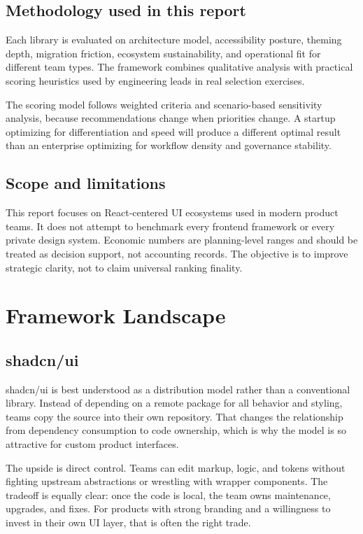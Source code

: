 \documentclass[11pt,twoside,a4paper]{article}
\begin{document}
\subsection{Methodology used in this report}
Each library is evaluated on architecture model, accessibility posture, theming depth, migration friction, ecosystem sustainability, and operational fit for different team types. The framework combines qualitative analysis with practical scoring heuristics used by engineering leads in real selection exercises.

The scoring model follows weighted criteria and scenario-based sensitivity analysis, because recommendations change when priorities change. A startup optimizing for differentiation and speed will produce a different optimal result than an enterprise optimizing for workflow density and governance stability.

\subsection{Scope and limitations}
This report focuses on React-centered UI ecosystems used in modern product teams. It does not attempt to benchmark every frontend framework or every private design system. Economic numbers are planning-level ranges and should be treated as decision support, not accounting records. The objective is to improve strategic clarity, not to claim universal ranking finality.

\section{Framework Landscape}

\subsection{shadcn/ui}
shadcn/ui is best understood as a distribution model rather than a conventional library. Instead of depending on a remote package for all behavior and styling, teams copy the source into their own repository. That changes the relationship from dependency consumption to code ownership, which is why the model is so attractive for custom product interfaces.

The upside is direct control. Teams can edit markup, logic, and tokens without fighting upstream abstractions or wrestling with wrapper components. The tradeoff is equally clear: once the code is local, the team owns maintenance, upgrades, and fixes. For products with strong branding and a willingness to invest in their own UI layer, that is often the right trade.
\end{document}
